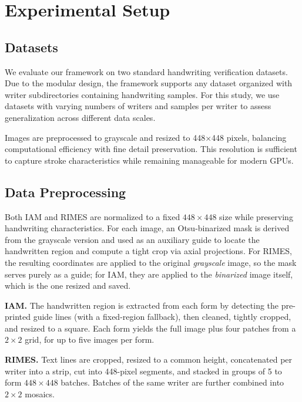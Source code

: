 \section{Experimental Setup}\label{sec:experiments}

\subsection{Datasets}

We evaluate our framework on two standard handwriting verification datasets. Due to the modular design, the framework supports any dataset organized with writer subdirectories containing handwriting samples. For this study, we use datasets with varying numbers of writers and samples per writer to assess generalization across different data scales.

Images are preprocessed to grayscale and resized to 448×448 pixels, balancing computational efficiency with fine detail preservation. This resolution is sufficient to capture stroke characteristics while remaining manageable for modern GPUs.

\subsection{Data Preprocessing}

Both IAM and RIMES are normalized to a fixed $448\times448$ size while preserving handwriting
characteristics. For each image, an Otsu-binarized mask is derived from the grayscale version and
used as an auxiliary guide to locate the handwritten region and compute a tight crop via axial
projections. For RIMES, the resulting coordinates are applied to the original \emph{grayscale}
image, so the mask serves purely as a guide; for IAM, they are applied to the \emph{binarized}
image itself, which is the one resized and saved.

\textbf{IAM.} The handwritten region is extracted from each form by detecting the pre-printed
guide lines (with a fixed-region fallback), then cleaned, tightly cropped, and resized to
a square. Each form yields the full image plus four patches from a $2\times2$ grid, for up to five
images per form.

\textbf{RIMES.} Text lines are cropped, resized to a common height, concatenated per writer into a
strip, cut into 448-pixel segments, and stacked in groups of 5 to form $448\times448$ batches.
Batches of the same writer are further combined into $2\times2$ mosaics.

